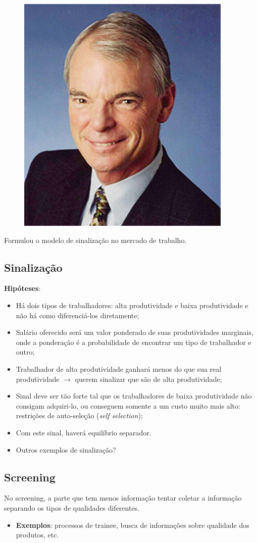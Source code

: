 \documentclass[a4paper,12pt]{article}[abntex2]
\begin{document}
\begin{figure}
    \centering
    \includegraphics[width=0.5\linewidth]{Imagens/a11i2.png}
\end{figure}

Formulou o modelo de sinalização no mercado de trabalho.

\subsection{\textbf{Sinalização}}
\textbf{Hipóteses}:\begin{itemize}
    \item Há dois tipos de trabalhadores: alta produtividade e baixa produtividade e não há como diferenciá-los diretamente;
    \item Salário oferecido será um valor ponderado de suas produtividades marginais, onde a ponderação é a probabilidade de encontrar um tipo de trabalhador e outro;
    \item Trabalhador de alta produtividade ganhará menos do que sua real produtividade \(\rightarrow\) querem sinalizar que são de alta produtividade;
    \item Sinal deve ser tão forte tal que os trabalhadores de baixa produtividade não consigam adquiri-lo, ou conseguem somente a um custo muito mais alto: restrições de auto-seleção (\textit{self selection});
    \item Com este sinal, haverá equilíbrio separador.
    \item Outros exemplos de sinalização?
\end{itemize}

\subsection{\textbf{Screening}}
No screening, a parte que tem menos informação tentar coletar a informação separando os tipos de qualidades diferentes.\begin{itemize}
    \item \textbf{Exemplos}: processos de trainee, busca de informações sobre qualidade dos produtos, etc. 
\end{itemize}
\end{document}
